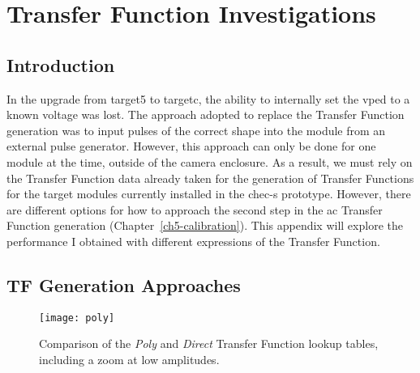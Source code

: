 \chapter{\label{a4-tf}Transfer Function Investigations}

\minitoc

\section{Introduction}

In the upgrade from \gls{target5} to \gls{targetc}, the ability to internally set the \gls{vped} to a known voltage was lost. The approach adopted to replace the Transfer Function generation was to input pulses of the correct shape into the module from an external pulse generator. However, this approach can only be done for one module at the time, outside of the camera enclosure. As a result, we must rely on the Transfer Function data already taken for the generation of Transfer Functions for the \gls{target} modules currently installed in the \gls{chec-s} prototype. However, there are different options for how to approach the second step in the \gls{ac} Transfer Function generation (Chapter~\ref{ch5-calibration}). This appendix will explore the performance I obtained with different expressions of the Transfer Function.

\section{TF Generation Approaches}

\begin{figure}
	\centering
	\texttt{[image: poly]} 
	\caption[Comparison of the \textit{Poly} and \textit{Direct} Transfer Function lookup tables.]{Comparison of the \textit{Poly} and \textit{Direct} Transfer Function lookup tables, including a zoom at low amplitudes.} 
	\label{fig:poly}
\end{figure}

